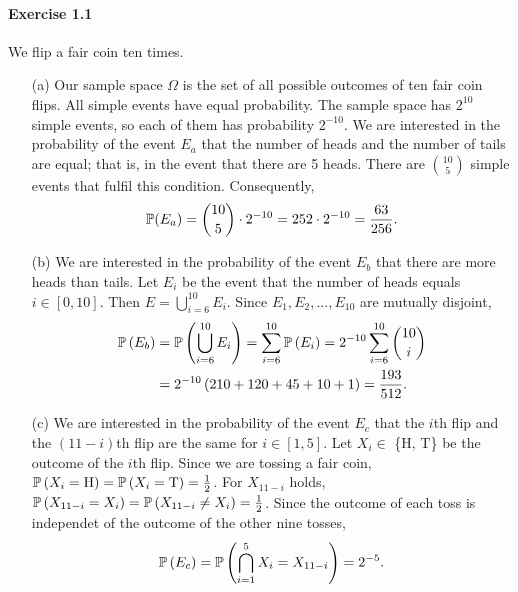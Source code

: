 \paragraph{Exercise 1.1} We flip a fair coin ten times.
\begin{enumerate}
  \item[(a)] Our sample space $\Omega$ is the set of all possible outcomes of ten
    fair coin flips. All simple events have equal probability. The sample space has
    $2^{10}$ simple events, so each of them has probability $2^{-10}$. We are
    interested in the probability of the event $E_a$ that the number of heads and
    the number of tails are equal; that is, in the event that there are 5 heads.
    There are $\binom{10}{5}$ simple events that fulfil this condition. Consequently,
    \[
      \mathbb{P}(E_a) = \binom{10}{5} \cdot 2^{-10} = 252 \cdot 2^{-10} = \frac{63}{256}.
    \]

  \item[(b)] We are interested in the probability of the event $E_b$ that there are
    more heads than tails. Let $E_i$ be the event that the number of heads equals
    $i \in [0, 10]$. Then $E = \bigcup_{i = 6}^{10} E_i$. Since $E_1, E_2,..., E_{10}$
    are mutually disjoint,
    \begin{align*}
      \mathbb{P}\left(E_b\right)
        &= \mathbb{P}\left(\bigcup_{i = 6}^{10} E_i \right)      = \sum_{i=6}^{10} \mathbb{P}\left(E_i\right) = 2^{-10} \sum_{i=6}^{10} \binom{10}{i} \\
        &= 2^{-10} \left( 210 + 120 + 45 + 10 + 1\right)  = \frac{193}{512}.
    \end{align*}

  \item[(c)] We are interested in the probability of the event $E_c$ that the $i$th
    flip and the $(11 - i)$th flip are the same for $i \in [1,5]$. Let
    $X_i \in$ \{H, T\} be the outcome of the $i$th flip. Since we are tossing a
    fair coin, $\mathbb{P}\left(X_i = \text{H} \right) = \mathbb{P}\left(X_i = \text{T} \right) = \frac{1}{2}$.
    For $X_{11-i}$ holds, $\mathbb{P}\left(X_{11-i} = X_i \right) = \mathbb{P}\left(X_{11-i}
    \not= X_i \right) = \frac{1}{2}$. Since the outcome of each toss is independet
    of the outcome of the other nine tosses,
    \[
      \mathbb{P}\left(E_c\right)
        = \mathbb{P}\left(\bigcap_{i=1}^5 X_i = X_{11-i}\right)
        = 2^{-5}.
    \]


\end{enumerate}
